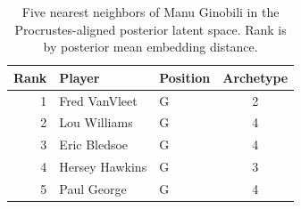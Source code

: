 \begin{table}[htbp]
  \centering\small
  \begin{tabular}{rllc}
    \toprule
    Rank & Player & Position & Archetype \\
    \midrule
    1 & Fred VanVleet & G & 2 \\
    2 & Lou Williams & G & 4 \\
    3 & Eric Bledsoe & G & 4 \\
    4 & Hersey Hawkins & G & 3 \\
    5 & Paul George & G & 4 \\
    \bottomrule
  \end{tabular}
  \caption{Five nearest neighbors of Manu Ginobili in the Procrustes-aligned posterior latent space. Rank is by posterior mean embedding distance.}
  \label{tab:Manu_Ginobili_neighbors}
\end{table}

